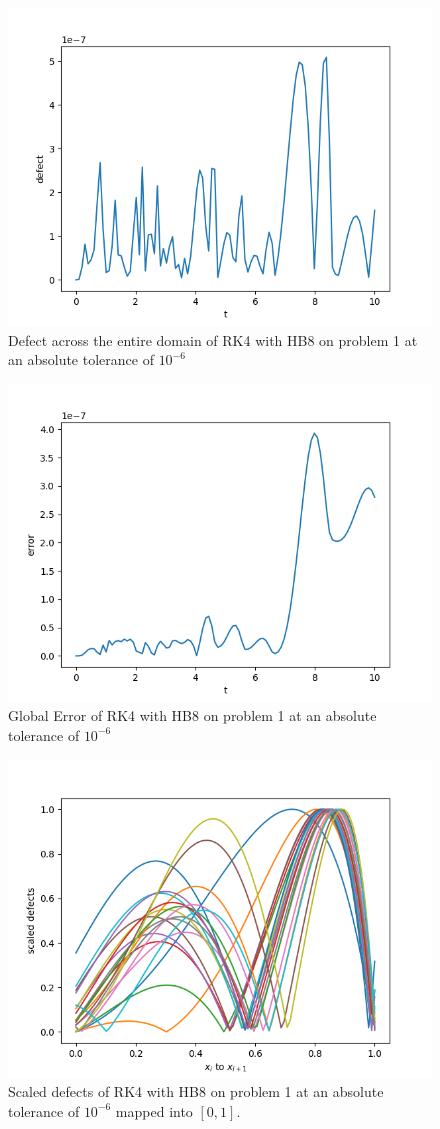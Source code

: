 \documentclass{article}
\begin{document}
\begin{figure}[H]
\centering
\includegraphics[width=0.7\linewidth]{./figures/rk4_with_hb8_p1_global_defect}
\caption{Defect across the entire domain of RK4 with HB8 on problem 1 at an absolute tolerance of $10^{-6}$}
\label{fig:rk4_with_hb8_p1_global_defect}
\end{figure}

\begin{figure}[H]
\centering
\includegraphics[width=0.7\linewidth]{./figures/rk4_with_hb8_p1_global_error}
\caption{Global Error of RK4 with HB8 on problem 1 at an absolute tolerance of $10^{-6}$}
\label{fig:rk4_with_hb8_p1_global_error}
\end{figure}

\begin{figure}[H]
\centering
\includegraphics[width=0.7\linewidth]{./figures/rk4_with_hb8_p1_scaled_defects}
\caption{Scaled defects of RK4 with HB8 on problem 1 at an absolute tolerance of $10^{-6}$ mapped into $[0, 1]$.}
\label{fig:rk4_with_hb8_p1_scaled_defects}
\end{figure}
\end{document}
